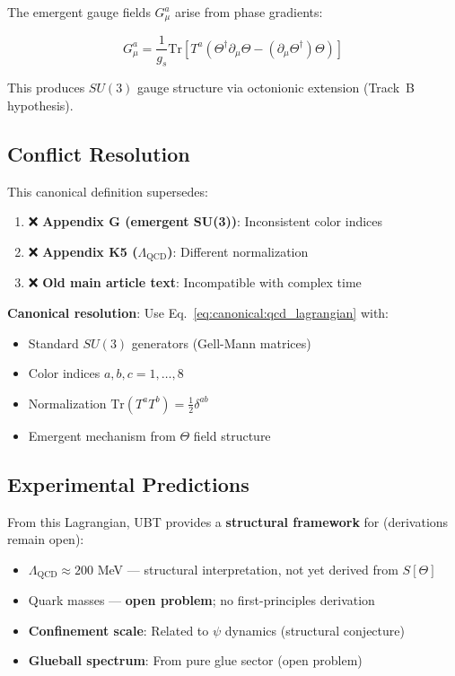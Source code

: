 The emergent gauge fields $G^a_\mu$ arise from phase gradients:

\begin{equation}
G^a_\mu = \frac{1}{g_s} \text{Tr}\left[T^a \left(\Theta^\dagger \partial_\mu \Theta - (\partial_\mu\Theta^\dagger)\Theta\right)\right]
\end{equation}

This produces $SU(3)$ gauge structure via octonionic extension (Track~B hypothesis).

\subsection{Conflict Resolution}

This canonical definition supersedes:

\begin{enumerate}
    \item ❌ \textbf{Appendix G (emergent SU(3))}: Inconsistent color indices
    \item ❌ \textbf{Appendix K5 ($\Lambda_{\text{QCD}}$)}: Different normalization
    \item ❌ \textbf{Old main article text}: Incompatible with complex time
\end{enumerate}

\textbf{Canonical resolution}: Use Eq.~\ref{eq:canonical:qcd_lagrangian} with:
\begin{itemize}
    \item Standard $SU(3)$ generators (Gell-Mann matrices)
    \item Color indices $a, b, c = 1, \ldots, 8$
    \item Normalization $\text{Tr}(T^a T^b) = \frac{1}{2}\delta^{ab}$
    \item Emergent mechanism from $\Theta$ field structure
\end{itemize}

\subsection{Experimental Predictions}

From this Lagrangian, UBT provides a \textbf{structural framework} for
(derivations remain open):

\begin{itemize}
    \item $\Lambda_{\text{QCD}} \approx 200$ MeV — structural interpretation,
      not yet derived from $S[\Theta]$
    \item Quark masses — \textbf{open problem}; no first-principles derivation
    \item \textbf{Confinement scale}: Related to $\psi$ dynamics (structural conjecture)
    \item \textbf{Glueball spectrum}: From pure glue sector (open problem)
\end{itemize}

